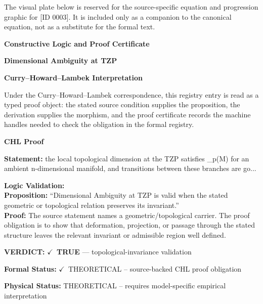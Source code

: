 \begingroup\footnotesize\sloppy
The visual plate below is reserved for the source-specific equation and progression graphic for [ID 0003]. It is included only as a companion to the canonical equation, not as a substitute for the formal text.
\par\endgroup
\ifTZPDarkEdition
{}
\fi

\clearpage
\begingroup\tzpsupportsetup
\noindent\textbf{\fontsize{10.8pt}{12.8pt}\selectfont [ID 0003] Constructive Logic and Proof Certificate}\par
\noindent\textbf{\fontsize{10pt}{12pt}\selectfont Dimensional Ambiguity at TZP}\par
\vspace{0.45em}
\begingroup
\footnotesize
\setlength{\parskip}{0.22em}
\setlength{\parindent}{0pt}
\noindent\textbf{Curry--Howard--Lambek Interpretation}\par
Under the Curry--Howard--Lambek correspondence, this registry entry is read as a typed proof
object: the stated source condition supplies the proposition, the derivation supplies the
morphism, and the proof certificate records the machine handles needed to check the obligation
in the formal registry.

\vspace{0.45em}
\noindent\textbf{CHL Proof}\par
\textbf{Statement:} the local topological dimension at the TZP satisfies \_p(M) for an ambient
n-dimensional manifold, and transitions between these branches are go...

\textbf{Logic Validation:}\\
\textbf{Proposition:} ``Dimensional Ambiguity at TZP is valid when the stated geometric or topological relation
preserves its invariant.''\\
\textbf{Proof:} The source statement names a geometric/topological carrier. The proof obligation is to
show that deformation, projection, or passage through the stated structure leaves the
relevant invariant or admissible region well defined.

\textbf{VERDICT:} \ensuremath{\checkmark}\ \textbf{TRUE} --- topological-invariance validation

\textbf{Formal Status:} \ensuremath{\checkmark}\ THEORETICAL -- source-backed CHL proof obligation

\textbf{Physical Status:} THEORETICAL -- requires model-specific empirical interpretation
\par\vspace{0.45em}
\par
\ifTZPDarkEdition
{}
\fi
\endgroup
\endgroup
